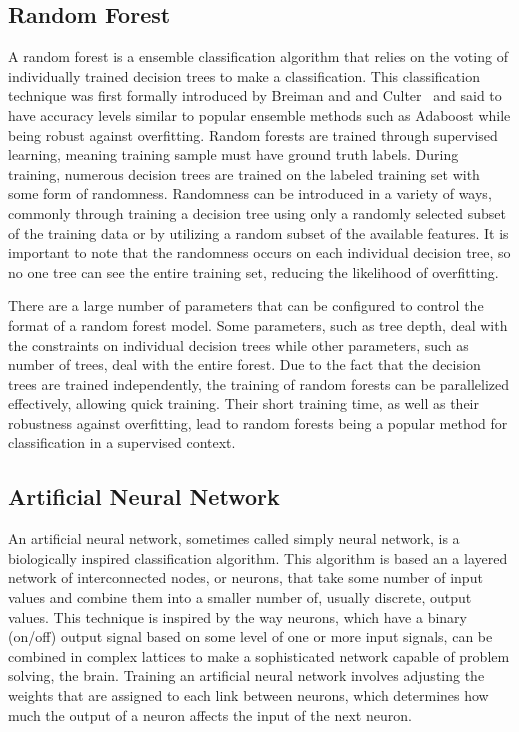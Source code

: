 \documentclass[11pt]{article}
\begin{document}
	\subsection{Random Forest}
	A random forest is a ensemble classification algorithm that relies on the voting of individually trained decision trees to make a classification. This classification technique was first formally introduced by Breiman and and Culter~\cite{Breiman} and said to have accuracy levels similar to popular ensemble methods such as Adaboost while being robust against overfitting. Random forests are trained through supervised learning, meaning training sample must have ground truth labels. During training, numerous decision trees are trained on the labeled training set with some form of randomness. Randomness can be introduced in a variety of ways, commonly through training a decision tree using only a randomly selected subset of the training data or by utilizing a random subset of the available features. It is important to note that the randomness occurs on each individual decision tree, so no one tree can see the entire training set, reducing the likelihood of overfitting.
	
	There are a large number of parameters that can be configured to control the format of a random forest model. Some parameters, such as tree depth, deal with the constraints on individual decision trees while other parameters, such as number of trees, deal with the entire forest. Due to the fact that the decision trees are trained independently, the training of random forests can be parallelized effectively, allowing quick training. Their short training time, as well as their robustness against overfitting, lead to random forests being a popular method for classification in a supervised context. 
	
	\subsection{Artificial Neural Network}
	An artificial neural network, sometimes called simply neural network, is a biologically inspired classification algorithm. This algorithm is based an a layered network of interconnected nodes, or neurons, that take some number of input values and combine them into a smaller number of, usually discrete, output values. This technique is inspired by the way neurons, which have a binary (on/off) output signal based on some level of one or more input signals, can be combined in complex lattices to make a sophisticated network capable of problem solving, the brain. Training an artificial neural network involves adjusting the weights that are assigned to each link between neurons, which determines how much the output of a neuron affects the input of the next neuron.
	
\end{document}
